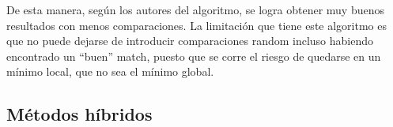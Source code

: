 \documentclass[assd_tpf_main.tex]{subfiles}
\begin{document}
De esta manera, seg\'un los autores del algoritmo, se logra obtener muy buenos resultados con menos comparaciones. La limitaci\'on que tiene este algoritmo es que no puede dejarse
de introducir comparaciones random incluso habiendo encontrado un ``buen'' match,
puesto que se corre el riesgo de quedarse en un m\'inimo local, que no sea el m\'inimo
global.

\subsection{M\'etodos h\'ibridos}
\end{document}
